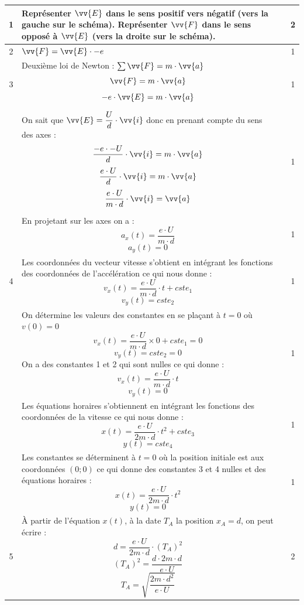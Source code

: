 \documentclass[a4paper,11pt,fleqn]{article}%
\begin{document}
\begin{longtable}{|c|m{.7\linewidth}|c|c|}
    \hline
    \tabletail{\hline}
    1 & Représenter $\vv{E}$ dans le sens positif vers négatif (vers la gauche sur le schéma). Représenter $\vv{F}$ dans le sens opposé à $\vv{E}$ (vers la droite sur le schéma).
    & & 2\\
    \hline

    2 & $\vv{F} = \vv{E} \cdot -e$
    & & 1\\
    \hline

    3 & Deuxième loi de Newton : $\sum{\vv{F}} = m\cdot \vv{a}$
    $$ \vv{F} = m\cdot \vv{a}$$
    $$  -e \cdot \vv{E}= m\cdot \vv{a}$$
    & & 1\\
    & On sait que $\vv{E} = \dfrac{U}{d}\cdot \vv{i}$ donc en prenant compte du sens des axes :
    $$   \dfrac{-e\cdot -U}{d}\cdot \vv{i}= m\cdot \vv{a}$$
    $$   \dfrac{e\cdot U}{d}\cdot \vv{i}= m\cdot \vv{a}$$
    $$   \dfrac{e\cdot U}{m\cdot d}\cdot \vv{i}= \vv{a}$$
    & & 1\\
    & En projetant sur les axes on a : $$a_x(t) =\dfrac{e\cdot U}{m\cdot d}$$
    $$a_y(t) = 0 $$
    & & 1\\
    \hline

    4 & Les coordonnées du vecteur vitesse s'obtient en intégrant les fonctions des coordonnées de l'accélération ce qui nous donne : 
    $$v_x(t) =\dfrac{e\cdot U}{m\cdot d}\cdot t + cste_1 $$
    $$v_y(t) = cste_2 $$
    & & 1\\
    & On détermine les valeurs des constantes en se plaçant à $t=0$ où $v(0) = 0$
    $$v_x(t) =\dfrac{e\cdot U}{m\cdot d}\times 0 + cste_1 = 0$$
    $$v_y(t) = cste_2 =0$$
    On a des constantes 1 et 2 qui sont nulles ce qui donne :
    $$v_x(t) =\dfrac{e\cdot U}{m\cdot d}\cdot t $$
    $$v_y(t) = 0 $$
    & & 1\\
    & Les équations horaires s'obtiennent en intégrant les fonctions des coordonnées de la vitesse ce qui nous donne :
    $$x(t) =\dfrac{e\cdot U}{2 m\cdot d}\cdot t^2 + cste_3 $$
    $$y(t) = cste_4 $$
    & & 1\\
    & Les constantes se déterminent à $t=0$ où la position initiale est aux coordonnées $(0;0)$ ce qui donne des constantes 3 et 4 nulles et des équations horaires : 
    $$x(t) =\dfrac{e\cdot U}{2 m\cdot d}\cdot t^2 $$
    $$y(t) = 0$$
    & & 1\\
    \hline
    
    5 & À partir de l'équation $x(t)$, à la date $T_A$ la position $x_A = d$, on peut écrire :
    $$d =\dfrac{e\cdot U}{2 m\cdot d}\cdot (T_A)^2 $$
    $$(T_A)^2  =\dfrac{d\cdot 2 m\cdot d}{e\cdot U}  $$
    $$T_A  =\sqrt{\dfrac{ 2 m\cdot d^2}{e\cdot U}}$$
     & & 2\\
    \hline


\end{longtable}
\end{document}
